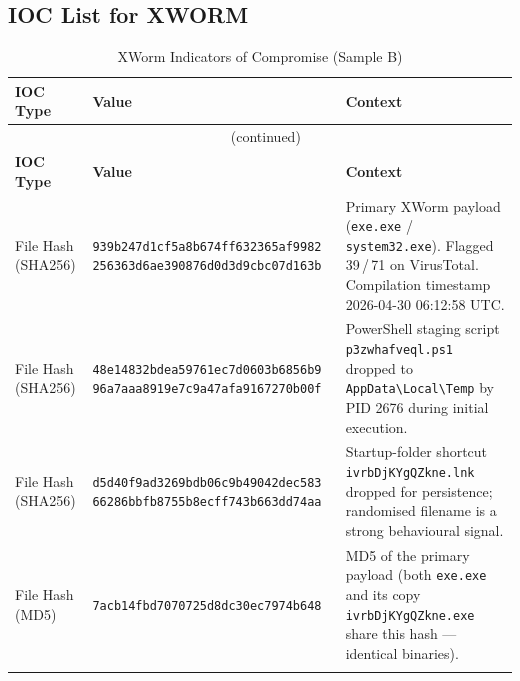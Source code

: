 \documentclass[10pt]{article}
\begin{document}
\subsection{IOC List for XWORM} 
\begin{longtable}{p{2.8cm} p{6.8cm} p{5.0cm}}
\caption{XWorm Indicators of Compromise (Sample B)} \label{tab:ioc} \\
\toprule
\textbf{IOC Type} & \textbf{Value} & \textbf{Context} \\
\midrule
\endfirsthead
 
\multicolumn{3}{c}{\tablename\ \thetable{} (continued)} \\
\toprule
\textbf{IOC Type} & \textbf{Value} & \textbf{Context} \\
\midrule
\endhead
 
\bottomrule
\endfoot
 
\bottomrule
\endlastfoot
 
File Hash (SHA256)
  & \texttt{\small 939b247d1cf5a8b674ff632365af9982} \newline
    \texttt{\small 256363d6ae390876d0d3d9cbc07d163b}
  & Primary XWorm payload (\texttt{exe.exe} / \texttt{system32.exe}).
    Flagged 39\,/\,71 on VirusTotal.
    Compilation timestamp 2026-04-30 06:12:58 UTC. \\
\addlinespace
 
File Hash (SHA256)
  & \texttt{\small 48e14832bdea59761ec7d0603b6856b9} \newline
    \texttt{\small 96a7aaa8919e7c9a47afa9167270b00f}
  & PowerShell staging script \texttt{p3zwhafveql.ps1}
    dropped to \texttt{AppData\textbackslash Local\textbackslash Temp}
    by PID 2676 during initial execution. \\
\addlinespace
 
File Hash (SHA256)
  & \texttt{\small d5d40f9ad3269bdb06c9b49042dec583} \newline
    \texttt{\small 66286bbfb8755b8ecff743b663dd74aa}
  & Startup-folder shortcut \texttt{ivrbDjKYgQZkne.lnk}
    dropped for persistence; randomised filename is
    a strong behavioural signal. \\
\addlinespace
 
File Hash (MD5)
  & \texttt{\small 7acb14fbd7070725d8dc30ec7974b648}
  & MD5 of the primary payload (both \texttt{exe.exe}
    and its copy \texttt{ivrbDjKYgQZkne.exe} share
    this hash — identical binaries). \\
\addlinespace
 

\end{longtable}
\end{document}
